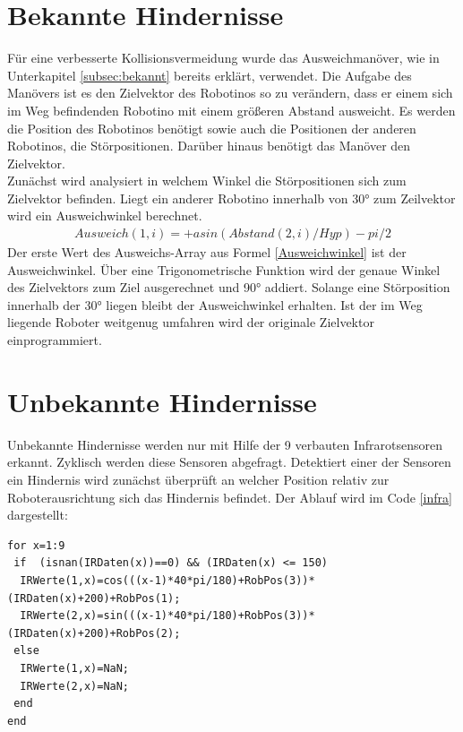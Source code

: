 \section{Bekannte Hindernisse}

Für eine verbesserte Kollisionsvermeidung wurde das Ausweichmanöver, wie in Unterkapitel \ref{subsec:bekannt} bereits erklärt, verwendet. Die Aufgabe des Manövers ist es den Zielvektor des Robotinos so zu verändern, dass er einem sich im Weg befindenden Robotino mit einem größeren Abstand ausweicht.
Es werden die Position des Robotinos benötigt sowie auch die Positionen der anderen Robotinos, die Störpositionen. Darüber hinaus benötigt das Manöver den Zielvektor.\\
Zunächst wird analysiert in welchem Winkel die Störpositionen sich zum Zielvektor befinden. Liegt ein anderer Robotino innerhalb von \ang{30} zum Zeilvektor wird ein Ausweichwinkel berechnet. 
\begin{align}
\label{Ausweichwinkel}
Ausweich(1,i)=+asin(Abstand(2,i)/Hyp)-pi/2
\end{align}
Der erste Wert des Ausweichs-Array aus Formel \ref{Ausweichwinkel} ist der Ausweichwinkel. Über eine Trigonometrische Funktion wird der genaue Winkel des Zielvektors zum Ziel ausgerechnet und \ang{90} addiert.
Solange eine Störposition innerhalb der \ang{30} liegen bleibt der Ausweichwinkel erhalten. Ist der im Weg liegende Roboter weitgenug umfahren wird der originale Zielvektor einprogrammiert.

\section{Unbekannte Hindernisse}
 
Unbekannte Hindernisse werden nur mit Hilfe der 9 verbauten Infrarotsensoren erkannt. Zyklisch werden diese Sensoren abgefragt. Detektiert einer der Sensoren ein Hindernis wird zunächst überprüft an welcher Position relativ zur Roboterausrichtung sich das Hindernis befindet. Der Ablauf wird im Code \ref{infra} dargestellt:\\
\begin{lstlisting}[caption=Infraroterkennung,label=infra,basicstyle=\small]
for x=1:9
 if  (isnan(IRDaten(x))==0) && (IRDaten(x) <= 150)
  IRWerte(1,x)=cos(((x-1)*40*pi/180)+RobPos(3))*(IRDaten(x)+200)+RobPos(1);
  IRWerte(2,x)=sin(((x-1)*40*pi/180)+RobPos(3))*(IRDaten(x)+200)+RobPos(2);
 else
  IRWerte(1,x)=NaN;
  IRWerte(2,x)=NaN;
 end
end
\end{lstlisting}
